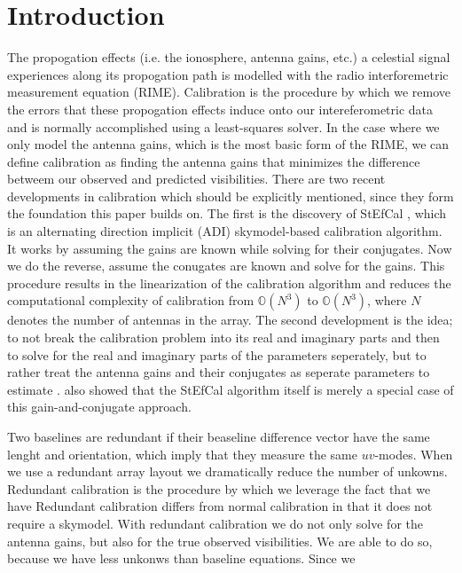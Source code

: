 \documentclass[useAMS,usenatbib]{mn2e}
\begin{document}
\section{Introduction}
The propogation effects (i.e. the ionosphere, antenna gains, etc.) a celestial signal experiences along its propogation path is modelled with the radio interforemetric measurement equation (RIME). %
Calibration is the procedure by which we remove the errors that these propogation effects induce onto our intereferometric data and is normally accomplished using a 
least-squares solver. In the case where we only model the antenna gains, which is the most basic form of the RIME, we can define calibration as finding the antenna gains that minimizes the difference betweem our observed and predicted visibilities. There are two recent developments
in calibration which should be explicitly mentioned, since they form the foundation this paper builds on. The first is the discovery of StEfCal \citep{salvini2014}, which 
is an alternating direction implicit (ADI) skymodel-based calibration algorithm. It works by assuming the gains are known while solving for their conjugates. Now we do the reverse,
assume the conugates are known and solve for the gains. This procedure results in the linearization of the calibration algorithm and reduces the computational complexity 
of calibration from $\mathbb{O}(N^3)$ to $\mathbb{O}(N^3)$, where $N$ denotes the number of antennas in the array. The second development is the idea; to not break the calibration problem 
into its real and imaginary parts and then to solve for the real and imaginary parts of the parameters seperately, but to rather treat the antenna gains and their 
conjugates as seperate parameters to estimate \citep{smirnov2015}. \citet{smirnov2015} also showed that the StEfCal algorithm itself is merely a special case of this
gain-and-conjugate approach. 

Two baselines are redundant if their beaseline difference vector have the same lenght and orientation, which imply that they measure the same $uv$-modes. When we use a redundant array layout we dramatically 
reduce the number of unkowns. Redundant calibration is the procedure by which we leverage the fact that we have 
Redundant calibration differs from normal calibration in that it does not require a skymodel. With redundant calibration we do not only solve for the antenna gains, but also 
for the true observed visibilities. We are able to do so, because we have less unkonws than baseline equations. Since we  
\end{document}
